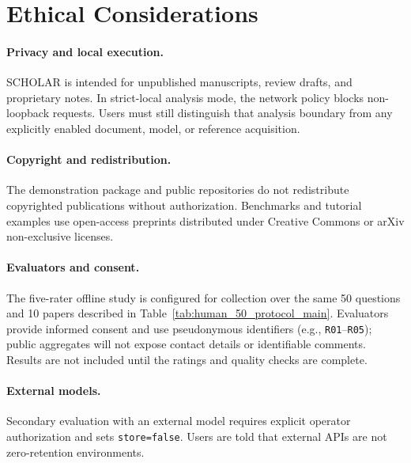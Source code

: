 \section*{Ethical Considerations}
\label{sec:ethics}

\paragraph{Privacy and local execution.}
\textsc{SCHOLAR} is intended for unpublished manuscripts, review drafts, and proprietary notes. In strict-local analysis mode, the network policy blocks non-loopback requests. Users must still distinguish that analysis boundary from any explicitly enabled document, model, or reference acquisition.

\paragraph{Copyright and redistribution.}
The demonstration package and public repositories do not redistribute copyrighted publications without authorization. Benchmarks and tutorial examples use open-access preprints distributed under Creative Commons or arXiv non-exclusive licenses.

\paragraph{Evaluators and consent.}
The five-rater offline study is configured for collection over the same 50 questions and 10 papers described in Table~\ref{tab:human_50_protocol_main}. Evaluators provide informed consent and use pseudonymous identifiers (e.g., \texttt{R01}--\texttt{R05}); public aggregates will not expose contact details or identifiable comments. Results are not included until the ratings and quality checks are complete.

\paragraph{External models.}
Secondary evaluation with an external model requires explicit operator authorization and sets \texttt{store=false}. Users are told that external APIs are not zero-retention environments.
